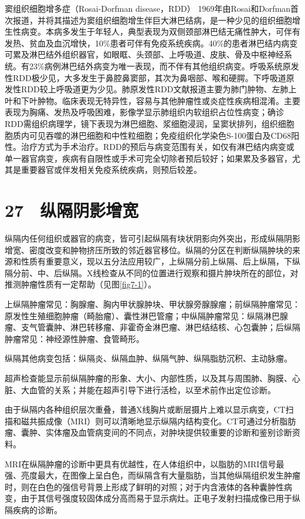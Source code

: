 窦组织细胞增多症（Rosai-Dorfman disease，RDD）
1969年由Rosai和Dorfman首次报道，并将其描述为窦组织细胞增生伴巨大淋巴结病，是一种少见的组织细胞增生性病变。本病多发生于年轻人，典型表现为双侧颈部淋巴结无痛性肿大，可伴有发热、贫血及血沉增快，10\%患者可伴有免疫系统疾病。40\%的患者淋巴结内病变可累及淋巴结外组织器官，如眼眶、头颈部、上呼吸道、皮肤、骨及中枢神经系统。有23\%病例淋巴结外病变为唯一表现，而不伴有其他组织病变。呼吸系统原发性RDD极少见，大多发生于鼻腔鼻窦部，其次为鼻咽部、喉和硬腭。下呼吸道原发性RDD较上呼吸道更为少见。肺原发性RDD文献报道主要为肺门肿物、左肺上叶和下叶肿物。临床表现无特异性，容易与其他肿瘤性或炎症性疾病相混淆。主要表现为胸痛、发热及呼吸困难，影像学显示肺组织内软组织占位性病变；确诊RDD需组织病理学，镜下表现为淋巴细胞、浆细胞浸润，呈窦状排列，组织细胞胞质内可见吞噬的淋巴细胞和中性粒细胞；免疫组织化学染色S-100蛋白及CD68阳性。治疗方式为手术治疗。RDD的预后与病变范围有关，如仅有淋巴结内病变或单一器官病变，疾病有自限性或手术可完全切除者预后较好；如果累及多器官，尤其是重要器官或伴发相关免疫系统疾病，则预后较差。

\protect\hypertarget{text00082.html}{}{}

\section{27　纵隔阴影增宽}

纵隔内任何组织或器官的病变，皆可引起纵隔有块状阴影向外突出，形成纵隔阴影增宽、密度改变和肿物挤压所致的邻近器官移位。纵隔的分区在判断纵隔肿块的来源和性质有重要意义，现以五分法应用较广，上纵隔分前上纵隔、后上纵隔，下纵隔分前、中、后纵隔。X线检查从不同的位置进行观察和摄片肿块所在的部位，对推测肿瘤性质有一定帮助（见图\ref{fig7-1}）。

上纵隔肿瘤常见：胸腺瘤、胸内甲状腺肿块、甲状腺旁腺腺瘤；前纵隔肿瘤常见：原发性生殖细胞肿瘤（畸胎瘤）、囊性淋巴管瘤；中纵隔肿瘤常见：纵隔淋巴腺瘤、支气管囊肿、淋巴转移瘤、非霍奇金淋巴瘤、淋巴结结核、心包囊肿；后纵隔肿瘤常见：神经源性肿瘤、食管畸形。

纵隔其他病变包括：纵隔炎、纵隔血肿、纵隔气肿、纵隔脂肪沉积、主动脉瘤。

超声检查能显示前纵隔肿瘤的形象、大小、内部性质，以及其与周围肺、胸膜、心脏、大血管的关系；并能在超声引导下进行活检，以至术前作出定位诊断。

由于纵隔内各种组织层次重叠，普通X线胸片或断层摄片上难以显示病变，CT扫描和磁共振成像（MRI）则可以清晰地显示纵隔内结构变化。CT可通过分析脂肪瘤、囊肿、实体瘤及血管病变间的不同点，对肿块提供较重要的诊断和鉴别诊断资料。

MRI在纵隔肿瘤的诊断中更具有优越性，在人体组织中，以脂肪的MRI信号最强、亮度最大，在图像上呈白色，而纵隔含有大量脂肪，当其他纵隔组织发生肿瘤时，则在白色的强信号背景上形成了鲜明的对照；对于内含液体的各种囊肿性病变，由于其信号强度较固体成分高而易于显示病灶。正电子发射扫描成像已用于纵隔疾病的诊断。

